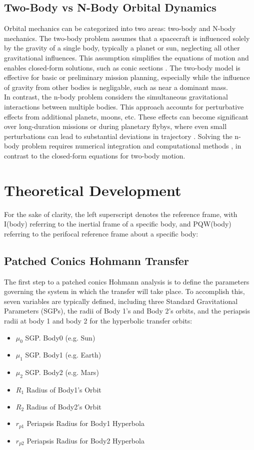 \documentclass[conference]{IEEEtran}
\begin{document}
\subsection{Two-Body vs N-Body Orbital Dynamics}

Orbital mechanics can be categorized into two areas: two-body and N-body mechanics. The two-body problem assumes that a spacecraft is influenced solely by the gravity of a single body, typically a planet or sun, neglecting all other gravitational influences. This assumption simplifies the equations of motion and enables closed-form solutions, such as conic sections \cite{b4,b5}. The two-body model is effective for basic or preliminary mission planning, especially while the influence of gravity from other bodies is negligable, such as near a dominant mass.\\

In contrast, the n-body problem considers the simultaneous gravitational interactions between multiple bodies. This approach accounts for perturbative effects from additional planets, moons, etc. These effects can become significant over long-duration missions or during planetary flybys, where even small perturbations can lead to substantial deviations in trajectory \cite{b6}. Solving the n-body problem requires numerical integration and computational methods \cite{b13,b14}, in contrast to the closed-form equations for two-body motion.
	
	\section{Theoretical Development}
	For the sake of clarity, the left superscript denotes the reference frame, with I(body) referring to the inertial frame of a specific body, and PQW(body) referring to the perifocal reference frame about a specific body:
	\subsection{Patched Conics Hohmann Transfer}
	
	The first step to a patched conics Hohmann analysis is to define the parameters governing the system in which the transfer will take place. To accomplish this, seven variables are typically defined, including three Standard Gravitational Parameters (SGPs), the radii of Body 1's and Body 2's orbits, and the periapsis radii at body 1 and body 2 for the hyperbolic transfer orbits:
	\begin{itemize}
		\item $\mu_0$ SGP. Body0 (e.g. Sun)
		\item $\mu_1$ SGP. Body1 (e.g. Earth)
		\item $\mu_2$ SGP. Body2 (e.g. Mars)
		\item $R_1$ Radius of Body1's Orbit
		\item $R_2$ Radius of Body2's Orbit
		\item $r_{p1}$ Periapsis Radius for Body1 Hyperbola
		\item $r_{p2}$ Periapsis Radius for Body2 Hyperbola
	\end{itemize}
	
\end{document}
